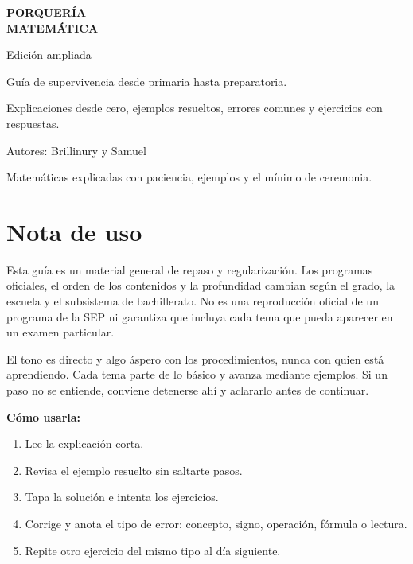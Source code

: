 \documentclass[10pt,oneside,openany]{book}
\begin{document}
\begin{titlepage}
\centering
\vspace*{2.3cm}
{\Huge\bfseries PORQUERÍA\\[4mm] MATEMÁTICA\par}
\vspace{8mm}
{\LARGE Edición ampliada\par}
\vspace{1.2cm}
\begin{tcolorbox}[width=.86\textwidth,colback=gris,colframe=tinta,arc=2mm,boxrule=1pt]
\centering\Large
Guía de supervivencia desde primaria hasta preparatoria.
\end{tcolorbox}
\vspace{1cm}
{\large Explicaciones desde cero, ejemplos resueltos, errores comunes y ejercicios con respuestas.\par}
\vfill
{\large Autores: Brillinury y Samuel\par}
\vspace{8mm}
{\small Matemáticas explicadas con paciencia, ejemplos y el mínimo de ceremonia.\par}
\end{titlepage}
\frontmatter
\chapter*{Nota de uso}
Esta guía es un material general de repaso y regularización. Los programas oficiales, el orden de los contenidos y la profundidad cambian según el grado, la escuela y el subsistema de bachillerato. No es una reproducción oficial de un programa de la SEP ni garantiza que incluya cada tema que pueda aparecer en un examen particular.

El tono es directo y algo áspero con los procedimientos, nunca con quien está aprendiendo. Cada tema parte de lo básico y avanza mediante ejemplos. Si un paso no se entiende, conviene detenerse ahí y aclararlo antes de continuar.

\textbf{Cómo usarla:}
\begin{enumerate}
\item Lee la explicación corta.
\item Revisa el ejemplo resuelto sin saltarte pasos.
\item Tapa la solución e intenta los ejercicios.
\item Corrige y anota el tipo de error: concepto, signo, operación, fórmula o lectura.
\item Repite otro ejercicio del mismo tipo al día siguiente.
\end{enumerate}
\end{document}
